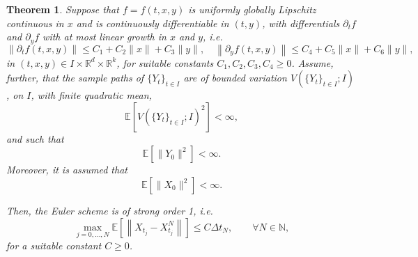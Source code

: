 \documentclass[reqno,12pt]{amsart}
\theoremstyle{plain} %
\newtheorem{theorem}{Theorem}[section]
\theoremstyle{definition} %
\begin{document}
\begin{theorem}
    \label{thmdiffmonotonicbound}
    Suppose that $f=f(t, x, y)$ is uniformly globally Lipschitz continuous in $x$ and is continuously differentiable in $(t, y)$, with differentials $\partial_t f$ and $\partial_y f$ with at most linear growth in $x$ and $y$, i.e.
    \begin{equation}
        \label{ftfylineargrowth}
        \left\|\partial_t f(t, x, y)\right\| \leq C_1 + C_2 \|x\| + C_3\|y\|, \quad \left\|\partial_y f(t, x, y)\right\| \leq C_4 + C_5\|x\| + C_6\|y\|,
    \end{equation}
    in $(t, x, y)\in I\times \mathbb{R}^d\times \mathbb{R}^k$, for suitable constants $C_1, C_2, C_3, C_4 \geq 0$.
    Assume, further, that the sample paths of $\{Y_t\}_{t\in I}$ are of bounded variation $V(\{Y_t\}_{t\in I}; I)$, on $I$, with finite quadratic mean,
    \begin{equation}
        \label{EYtboundedsquarevariation2}
        \mathbb{E}[V(\{Y_t\}_{t\in I}; I)^2] < \infty,
    \end{equation}
    and such that
    \begin{equation}
        \label{EY0square2}
        \mathbb{E}[\|Y_0\|^2] < \infty.
    \end{equation}
    Moreover, it is assumed that
    \begin{equation}
        \label{EX0square2}
        \mathbb{E}[\|X_0\|^2] < \infty.
    \end{equation}

    Then, the Euler scheme is of strong order 1, i.e.
    \begin{equation}
        \max_{j=0, \ldots, N}\mathbb{E}\left[ \left\| X_{t_j} - X_{t_j}^N \right\| \right] \leq C \Delta t_N, \qquad \forall N \in \mathbb{N},
    \end{equation}
    for a suitable constant $C \geq 0$.
\end{theorem}
\end{document}
